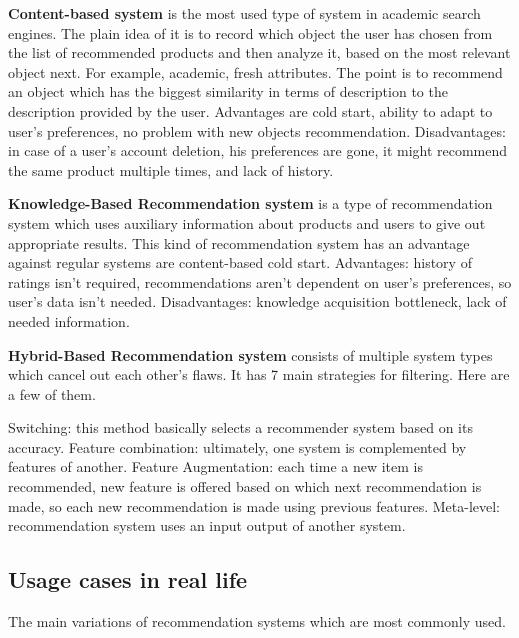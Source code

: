 \documentclass[10pt,twoside,english,a4paper]{article}
\begin{document}
\par \textbf{Content-based system} is the most used type of system in academic search engines. The plain idea of it is to record which object the user has chosen from the list of recommended products and then analyze it, based on the most relevant object next. For example, academic, fresh attributes. The point is to recommend an object which has the biggest similarity in terms of description to the description provided by the user. Advantages are cold start, ability to adapt to user's preferences, no problem with new objects recommendation. Disadvantages: in case of a user's account deletion, his preferences are gone, it might recommend the same product multiple times, and lack of history. 


\par \textbf{Knowledge-Based Recommendation system} is a type of recommendation system which uses auxiliary information about products and users to give out appropriate results. This kind of recommendation system has an advantage against regular systems are content-based cold start. 
Advantages: history of ratings isn't required, recommendations aren't dependent on user's preferences, so user's data isn't needed. Disadvantages: knowledge acquisition bottleneck, lack of needed information.




\par \textbf{Hybrid-Based Recommendation system} consists of multiple system types which cancel out each other's flaws. It has 7 main strategies for filtering. Here are a few of them.
\par Switching: this method basically selects a recommender system based on its accuracy. Feature combination: ultimately, one system is complemented by features of another. 
Feature Augmentation: each time a new item is recommended, new feature is offered based on which next recommendation is made, so each new recommendation is made using previous features. 
Meta-level: recommendation system uses an input output of another system. 
\subsection{Usage cases in real life}
The main variations of recommendation systems which are most commonly used.
\end{document}
